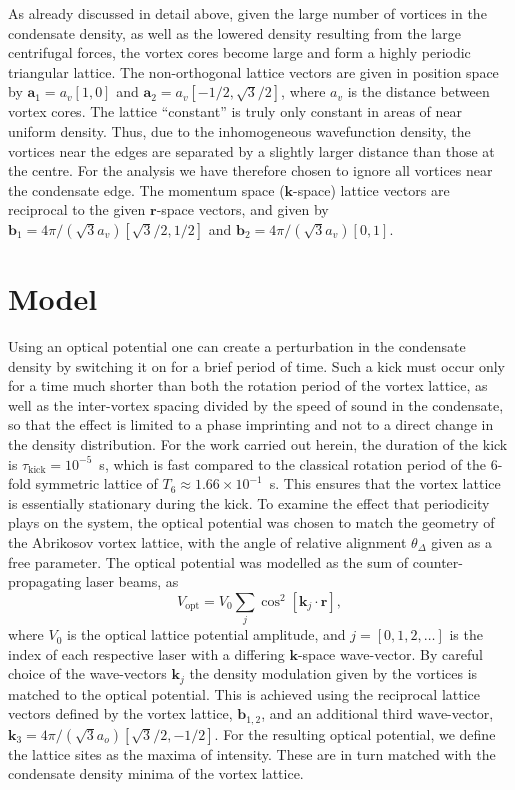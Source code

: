 As already discussed in detail above, given the large number of vortices in the condensate density, as well as the lowered density resulting from the large centrifugal forces, the vortex cores become large and form a highly periodic triangular lattice. The non-orthogonal lattice vectors are given in position space by $\mathbf{a}_1 = a_v[1,0]$ and $\mathbf{a}_2 = a_v[-1/2, \sqrt{3}/2]$, where $a_v$ is the distance between vortex cores. The lattice ``constant'' is truly only constant in areas of near uniform density. Thus, due to the inhomogeneous wavefunction density, the vortices near the edges are separated by a slightly larger distance than those at the centre. For the analysis we have therefore chosen to ignore all vortices near the condensate edge. The momentum space ($\mathbf{k}$-space) lattice vectors are reciprocal to the given $\mathbf{r}$-space vectors, and given by $\mathbf{b}_1 = 4\pi/(\sqrt{3}a_v)\left[\sqrt{3}/2,1/2\right]$ and $\mathbf{b}_2 = 4\pi/(\sqrt{3}a_v)\left[0,1\right]$.

\section{Model}

Using an optical potential one can create a perturbation in the condensate density by switching it on for a brief period of time. Such a kick must occur only for a time much shorter than both the rotation period of the vortex lattice, as well as the inter-vortex spacing divided by the speed of sound in the condensate, so that the effect is limited to a phase imprinting and not to a direct change in the density distribution. For the work carried out herein, the duration of the kick is $\tau_{\text{kick}}=10^{-5}$~s, which is fast compared to the classical rotation period of the 6-fold symmetric lattice of $T_{6} \approx 1.66\times 10^{-1}$~s. This ensures that the vortex lattice is essentially stationary during the kick. To examine the effect that periodicity plays on the system, the optical potential was chosen to match the geometry of the Abrikosov vortex lattice, with the angle of relative alignment $\theta_\Delta$ given as a free parameter. The optical potential was modelled as the sum of counter-propagating laser beams, as
\begin{equation}
    V_{\text{opt}} = V_0\displaystyle\sum_{j}\cos^2 \left[ \textbf{k}_{j}\cdot\textbf{r} \right],
\end{equation}
where $V_0$ is the optical lattice potential amplitude, and $j=[0,1,2,\ldots ]$ is the index of each respective laser with a differing $\mathbf{k}$-space wave-vector. By careful choice of the wave-vectors $\textbf{k}_{j}$ the density modulation given by the vortices is matched to the optical potential. This is achieved using the reciprocal lattice vectors defined by the vortex lattice, $\mathbf{b}_{1,2}$, and an additional third wave-vector, $\mathbf{k}_3 = 4\pi/(\sqrt{3}a_o)\left[\sqrt{3}/2,-1/2\right]$. For the resulting optical potential, we define the lattice sites as the maxima of intensity. These are in turn matched with the condensate density minima of the vortex lattice.

